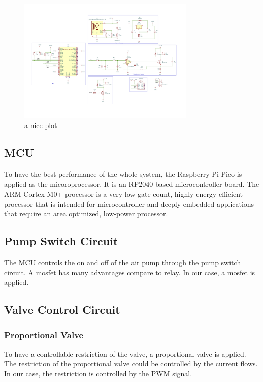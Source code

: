 \begin{figure}[h]
    \centering
    \captionsetup{justification=centering}
    \includegraphics[width=0.75\textwidth]{img/schematic.png}
    \caption{a nice plot}
    \label{fig:mesh1}
\end{figure}

\subsection{MCU}
To have the best performance of the whole system, the Raspberry Pi Pico is applied as the micoroprocessor. It is an RP2040-based microcontroller board. The ARM Cortex-M0+ processor is a very low gate count, highly energy efficient processor that is intended for microcontroller and deeply embedded applications that require an area optimized, low-power processor.

\subsection{Pump Switch Circuit}
The MCU controls the on and off of the air pump through the pump switch circuit. A mosfet has many advantages compare to relay. In our case, a mosfet is applied.


\subsection{Valve Control Circuit}
\subsubsection{Proportional Valve}
To have a controllable restriction of the valve, a proportional valve is applied. The restriction of the proportional valve could be controlled by the current flows. In our case, the restriction is controlled by the PWM signal.

